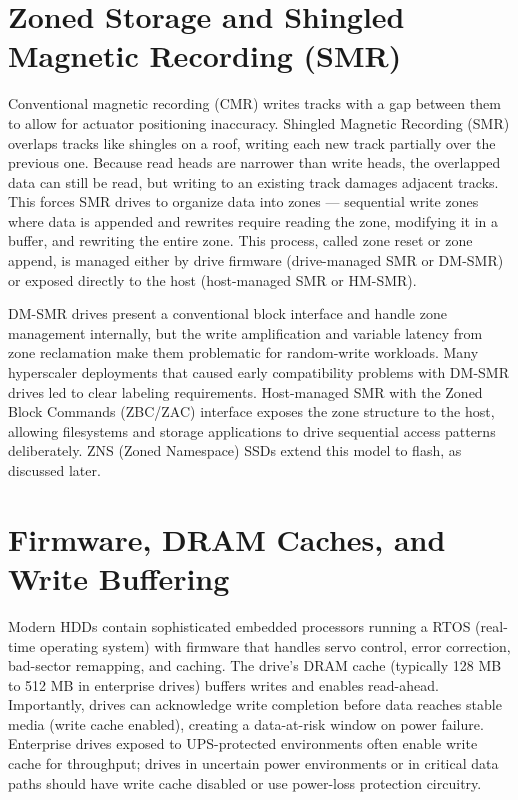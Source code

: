 \section{Zoned Storage and Shingled Magnetic Recording (SMR)}
Conventional magnetic recording (CMR) writes tracks with a gap between them to allow for actuator positioning inaccuracy. Shingled Magnetic Recording (SMR) overlaps tracks like shingles on a roof, writing each new track partially over the previous one. Because read heads are narrower than write heads, the overlapped data can still be read, but writing to an existing track damages adjacent tracks. This forces SMR drives to organize data into zones --- sequential write zones where data is appended and rewrites require reading the zone, modifying it in a buffer, and rewriting the entire zone. This process, called zone reset or zone append, is managed either by drive firmware (drive-managed SMR or DM-SMR) or exposed directly to the host (host-managed SMR or HM-SMR).

DM-SMR drives present a conventional block interface and handle zone management internally, but the write amplification and variable latency from zone reclamation make them problematic for random-write workloads. Many hyperscaler deployments that caused early compatibility problems with DM-SMR drives led to clear labeling requirements. Host-managed SMR with the Zoned Block Commands (ZBC/ZAC) interface exposes the zone structure to the host, allowing filesystems and storage applications to drive sequential access patterns deliberately. ZNS (Zoned Namespace) SSDs extend this model to flash, as discussed later.

\section{Firmware, DRAM Caches, and Write Buffering}
Modern HDDs contain sophisticated embedded processors running a RTOS (real-time operating system) with firmware that handles servo control, error correction, bad-sector remapping, and caching. The drive's DRAM cache (typically 128 MB to 512 MB in enterprise drives) buffers writes and enables read-ahead. Importantly, drives can acknowledge write completion before data reaches stable media (write cache enabled), creating a data-at-risk window on power failure. Enterprise drives exposed to UPS-protected environments often enable write cache for throughput; drives in uncertain power environments or in critical data paths should have write cache disabled or use power-loss protection circuitry.

